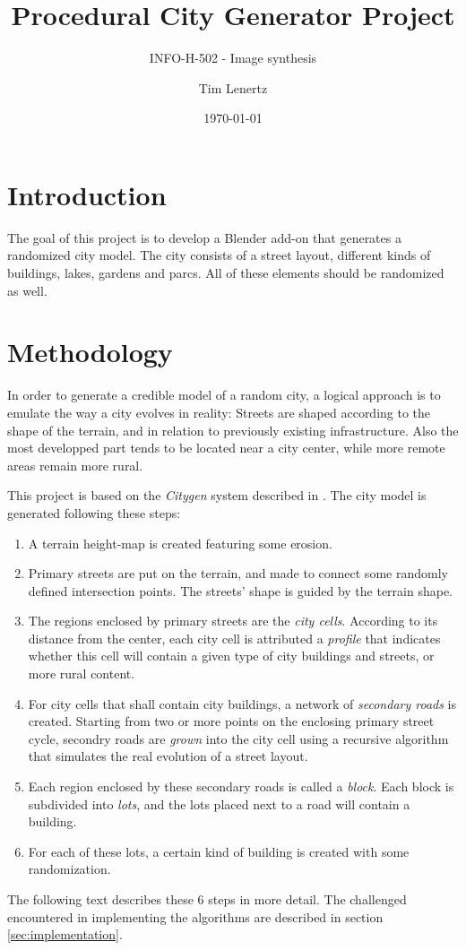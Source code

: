 \documentclass[a4paper,12pt]{scrartcl}
\begin{document}
\titlehead{Université Libre de Bruxelles}
\title{Procedural City Generator Project}
\subtitle{INFO-H-502 - Image synthesis}
\author{Tim Lenertz}
\date{\today}
\maketitle

\section{Introduction}
The goal of this project is to develop a Blender add-on that generates a randomized city model. The city consists of a street layout, different kinds of buildings, lakes, gardens and parcs. All of these elements should be randomized as well.

\section{Methodology}
In order to generate a credible model of a random city, a logical approach is to emulate the way a city evolves in reality: Streets are shaped according to the shape of the terrain, and in relation to previously existing infrastructure. Also the most developped part tends to be located near a city center, while more remote areas remain more rural.

This project is based on the \emph{Citygen} system described in \cite{Kell2007}. The city model is generated following these steps:
\begin{enumerate}
\item A terrain height-map is created featuring some erosion.
\item Primary streets are put on the terrain, and made to connect some randomly defined intersection points. The streets' shape is guided by the terrain shape.
\item The regions enclosed by primary streets are the \emph{city cells}. According to its distance from the center, each city cell is attributed a \emph{profile} that indicates whether this cell will contain a given type of city buildings and streets, or more rural content.
\item For city cells that shall contain city buildings, a network of \emph{secondary roads} is created. Starting from two or more points on the enclosing primary street cycle, secondry roads are \emph{grown} into the city cell using a recursive algorithm that simulates the real evolution of a street layout.
\item Each region enclosed by these secondary roads is called a \emph{block}. Each block is subdivided into \emph{lots}, and the lots placed next to a road will contain a building.
\item For each of these lots, a certain kind of building is created with some randomization.
\end{enumerate}
The following text describes these 6 steps in more detail. The challenged encountered in implementing the algorithms are described in section \ref{sec:implementation}.
\end{document}
